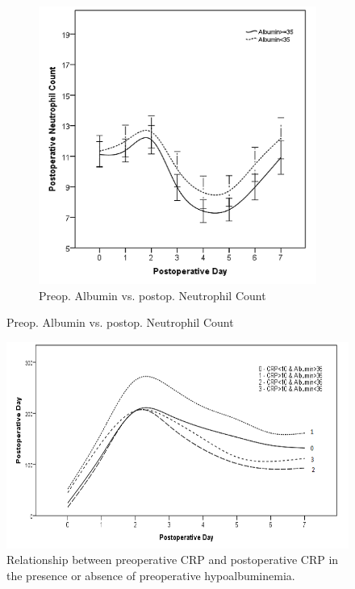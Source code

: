 \begin{figure}[p]
	\vspace{1cm}
	
	\begin{subfigure}{0.48\textwidth}
		\centering
		\includegraphics[width=\textwidth]{Figures/sirs_alb_neut}
		\caption{Preop. 
Albumin vs. 
postop. 
Neutrophil Count}
		\label{fig:sirs_alb_neut}
	\end{subfigure}	
\end{figure}

\clearpage
\begin{figure}[t]
	\centering
	\includegraphics[width=\textwidth]{Figures/sirs_crp_crp_alb}
	\caption{Relationship between preoperative CRP and postoperative CRP in the presence or absence of preoperative hypoalbuminemia.}
	\label{fig:sirs_crp_crp_alb}
\end{figure}

\clearpage

